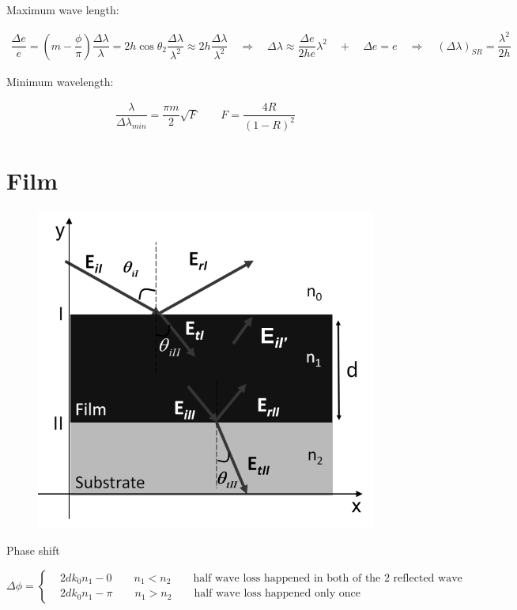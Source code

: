 Maximum wave length: 

\begin{equation*}
  \begin{aligned}
    \dfrac{\Delta e}{e} = \left( m - \dfrac{\phi}{\pi}  \right) \dfrac{\Delta \lambda}{\lambda} = 2 h \cos \theta_2 \dfrac{\Delta \lambda}{\lambda^2} \approx 2 h \dfrac{\Delta \lambda}{\lambda^2}
    \quad \Rightarrow \quad
    \Delta \lambda \approx \dfrac{\Delta e}{2 h e} \lambda^2
    \quad + \quad
    \Delta e = e
    \quad \Rightarrow \quad
    \left( \Delta \lambda \right)_{SR} = \dfrac{\lambda^2}{2h} 
  \end{aligned}
\end{equation*}

Minimum wavelength:

\begin{equation*}
  \begin{aligned}
    \dfrac{\lambda}{\Delta \lambda_{min}} = \dfrac{\pi m}{2} \sqrt{F}
    \quad\quad
    F = \dfrac{4 R}{\left( 1 - R \right)^2} 
  \end{aligned}
\end{equation*}

\section{Film}

\begin{figure}[H]
  \centering
  \includegraphics[width=0.5\linewidth]{figures/film.png}
\end{figure}

Phase shift

\begin{equation*}
  \Delta \phi = 
  \left\{
  \begin{aligned}
    & 2 d k_0 n_1 - 0 \quad\quad n_1 < n_2 \quad\quad \text{half wave loss happened in both of the 2 reflected wave}\\
    & 2 d k_0 n_1 - \pi \quad\quad n_1 > n_2 \quad\quad \text{half wave loss happened only once}
  \end{aligned}
  \right.
\end{equation*}

